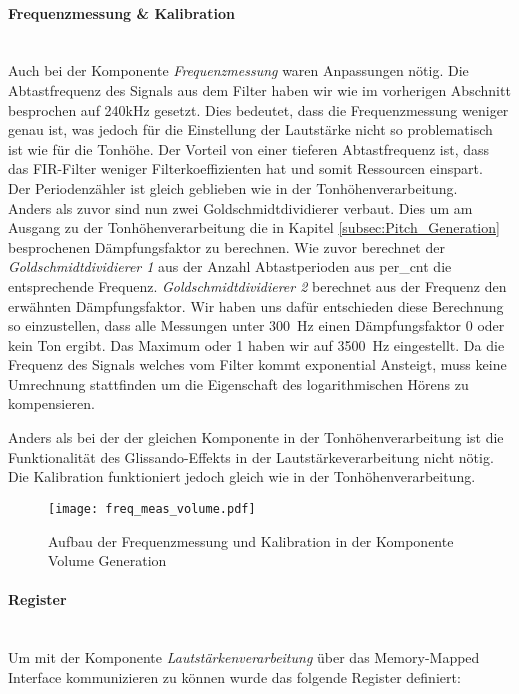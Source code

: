 \paragraph{Frequenzmessung \& Kalibration}\mbox{}\\
Auch bei der Komponente \textit{Frequenzmessung} waren Anpassungen nötig. 
Die Abtastfrequenz des Signals aus dem Filter haben wir wie im vorherigen Abschnitt besprochen auf 240kHz gesetzt. Dies bedeutet, dass die Frequenzmessung weniger genau ist, was jedoch für die Einstellung der Lautstärke nicht so problematisch ist wie für die Tonhöhe. Der Vorteil von einer tieferen Abtastfrequenz ist, dass das FIR-Filter weniger Filterkoeffizienten hat und somit Ressourcen einspart.\\
Der Periodenzähler ist gleich geblieben wie in der Tonhöhenverarbeitung.\\
Anders als zuvor sind nun zwei Goldschmidtdividierer verbaut. Dies um am Ausgang zu der Tonhöhenverarbeitung die in Kapitel \ref{subsec:Pitch_Generation} besprochenen Dämpfungsfaktor zu berechnen. Wie zuvor berechnet der \textit{Goldschmidtdividierer 1} aus der Anzahl Abtastperioden aus per\_cnt die entsprechende Frequenz. \textit{Goldschmidtdividierer 2} berechnet aus der Frequenz den erwähnten Dämpfungsfaktor. Wir haben uns dafür entschieden diese Berechnung so einzustellen, dass alle Messungen unter \SI{300}{Hz} einen Dämpfungsfaktor 0 oder kein Ton ergibt. Das Maximum oder 1 haben wir auf \SI{3500}{Hz} eingestellt. Da die Frequenz des Signals welches vom Filter kommt exponential Ansteigt, muss keine Umrechnung stattfinden um die Eigenschaft des logarithmischen Hörens zu kompensieren.

Anders als bei der der gleichen Komponente in der Tonhöhenverarbeitung ist die Funktionalität des Glissando-Effekts in der Lautstärkeverarbeitung nicht nötig. Die Kalibration funktioniert jedoch gleich wie in der Tonhöhenverarbeitung.

\begin{figure}[h!]
	\centering
	\texttt{[image: freq\_meas\_volume.pdf]}
	\caption{Aufbau der Frequenzmessung und Kalibration in der Komponente Volume Generation} 
	\label{img:freq_meas_volume}
\end{figure}  

\paragraph{Register}\mbox{}\\
Um mit der Komponente \textit{Lautstärkenverarbeitung} über das Memory-Mapped Interface kommunizieren zu können wurde das folgende Register definiert:


